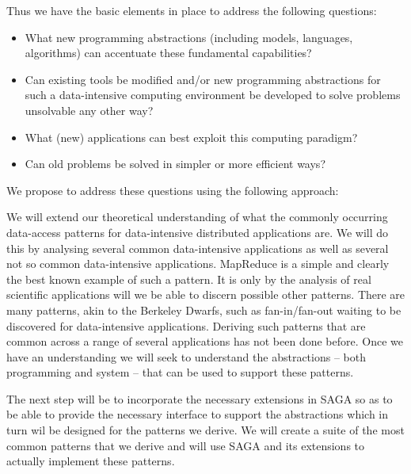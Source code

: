 \documentclass[10pt,letterpaper]{article}
\begin{document}
Thus we have the basic elements in place to address the following questions:

\begin{itemize}
\item What new programming abstractions (including models, languages, algorithms) can accentuate these fundamental capabilities?
\item Can existing tools be modified and/or new programming abstractions for such a data-intensive computing environment be developed to solve problems unsolvable any other way? 
\item What (new) applications can best exploit this computing paradigm?
\item Can old problems be solved in simpler or more efficient ways? 
\end{itemize}

We propose to address these questions  using the following  approach:

We will extend our theoretical understanding of what the commonly occurring 
data-access patterns for data-intensive distributed applications are. We will
do this by analysing several common data-intensive applications as well as
several not so common data-intensive applications.  
MapReduce is a simple and clearly the best known example of such 
a pattern. It is only by the analysis of real scientific applications will we be able
to discern possible other patterns. There are many patterns, akin to the Berkeley Dwarfs, such as fan-in/fan-out waiting to be discovered  for data-intensive applications.
Deriving such patterns
that are common across a range of several applications has not been done before.
Once we have an understanding we will seek to understand the abstractions --
both programming and system -- that can be used to support these patterns.

The next step will be to incorporate the necessary extensions in SAGA
so as to be able to provide the necessary interface to support the abstractions 
which in turn wil be designed for the patterns we derive.
We will  create a suite of the most common patterns that we derive 
and will use SAGA and its extensions to
actually implement these patterns. 

\end{document}

